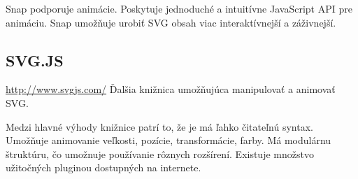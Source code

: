 
Snap podporuje animácie. Poskytuje jednoduché a intuitívne JavaScript API pre animáciu. Snap umožňuje urobiť SVG obsah viac interaktívnejší a záživnejší. 



\subsection{SVG.JS}
\url{http://www.svgjs.com/}
Ďalšia knižnica umožňujúca manipulovať a animovať SVG.

Medzi hlavné výhody knižnice patrí to, že je má ľahko čitateľnú syntax. Umožňuje animovanie veľkosti, pozície, transformácie, farby. Má modulárnu štruktúru, čo umožnuje používanie rôznych rozšírení. Existuje množstvo užitočných pluginou dostupných na internete. 

%

